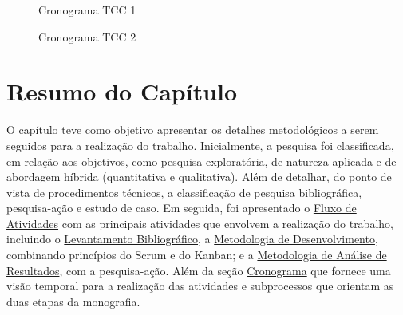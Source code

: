 \begin{figure}[h!]
	\centering
	\caption{Cronograma TCC 1}
	\label{fig06}
\end{figure}

\begin{figure}[h!]
	\centering
	\caption{Cronograma TCC 2}
	\label{fig07}
\end{figure}

\section{Resumo do Capítulo}
\label{sec:Resumo do Capitulo}
O capítulo teve como objetivo apresentar os detalhes metodológicos a serem seguidos para a realização do trabalho. Inicialmente, a pesquisa foi classificada, em relação aos objetivos, como pesquisa exploratória, de natureza aplicada 
e de abordagem híbrida (quantitativa e qualitativa). Além de detalhar, do ponto de vista de procedimentos técnicos, a classificação de pesquisa bibliográfica, pesquisa-ação e estudo de caso. Em seguida, foi apresentado o \hyperref[sec:Fluxo de Atividades]{Fluxo de Atividades}
com as principais atividades que envolvem a realização do trabalho, incluindo o \hyperref[sec:Levantamento Bibliografico]{Levantamento Bibliográfico}, a \hyperref[sec:Metodologia de Desenvolvimento]{Metodologia de Desenvolvimento}, combinando princípios do Scrum e do Kanban; e a 
\hyperref[sec:Metodologia de Analise de Resultados]{Metodologia de Análise de Resultados}, com a pesquisa-ação. Além da seção \hyperref[sec:Cronograma]{Cronograma} que fornece uma visão temporal para a realização das atividades e subprocessos que orientam as duas etapas da monografia.